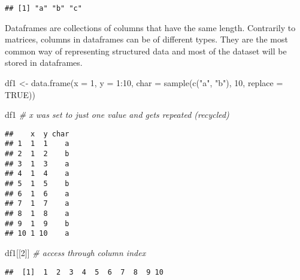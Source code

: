 \documentclass[
  oneside]{book}
\newenvironment{Shaded}{\begin{snugshade}}{\end{snugshade}}
\newcommand{\AttributeTok}[1]{\textcolor[rgb]{0.77,0.63,0.00}{#1}}
\newcommand{\CommentTok}[1]{\textcolor[rgb]{0.56,0.35,0.01}{\textit{#1}}}
\newcommand{\ConstantTok}[1]{\textcolor[rgb]{0.00,0.00,0.00}{#1}}
\newcommand{\DecValTok}[1]{\textcolor[rgb]{0.00,0.00,0.81}{#1}}
\newcommand{\FunctionTok}[1]{\textcolor[rgb]{0.00,0.00,0.00}{#1}}
\newcommand{\NormalTok}[1]{#1}
\newcommand{\OtherTok}[1]{\textcolor[rgb]{0.56,0.35,0.01}{#1}}
\newcommand{\SpecialCharTok}[1]{\textcolor[rgb]{0.00,0.00,0.00}{#1}}
\newcommand{\StringTok}[1]{\textcolor[rgb]{0.31,0.60,0.02}{#1}}
\begin{document}
\begin{Shaded}
\end{Shaded}

\begin{verbatim}
## [1] "a" "b" "c"
\end{verbatim}

Dataframes are collections of columns that have the same length.
Contrarily to matrices, columns in dataframes can be of different types.
They are the most common way of representing structured data and
most of the dataset will be stored in dataframes.

\begin{Shaded}
\begin{Highlighting}[]
\NormalTok{df1 }\OtherTok{\textless{}{-}} \FunctionTok{data.frame}\NormalTok{(}\AttributeTok{x =} \DecValTok{1}\NormalTok{, }\AttributeTok{y =} \DecValTok{1}\SpecialCharTok{:}\DecValTok{10}\NormalTok{,}
           \AttributeTok{char =} \FunctionTok{sample}\NormalTok{(}\FunctionTok{c}\NormalTok{(}\StringTok{"a"}\NormalTok{, }\StringTok{"b"}\NormalTok{), }\DecValTok{10}\NormalTok{, }\AttributeTok{replace =} \ConstantTok{TRUE}\NormalTok{))}

\NormalTok{df1 }\CommentTok{\# x was set to just one value and gets repeated (\textquotesingle{}recycled\textquotesingle{})}
\end{Highlighting}
\end{Shaded}

\begin{verbatim}
##    x  y char
## 1  1  1    a
## 2  1  2    b
## 3  1  3    a
## 4  1  4    a
## 5  1  5    b
## 6  1  6    a
## 7  1  7    a
## 8  1  8    a
## 9  1  9    b
## 10 1 10    a
\end{verbatim}

\begin{Shaded}
\begin{Highlighting}[]
\NormalTok{df1[[}\DecValTok{2}\NormalTok{]] }\CommentTok{\# access through column index}
\end{Highlighting}
\end{Shaded}

\begin{verbatim}
##  [1]  1  2  3  4  5  6  7  8  9 10
\end{verbatim}

\begin{Shaded}
\end{Shaded}
\end{document}
